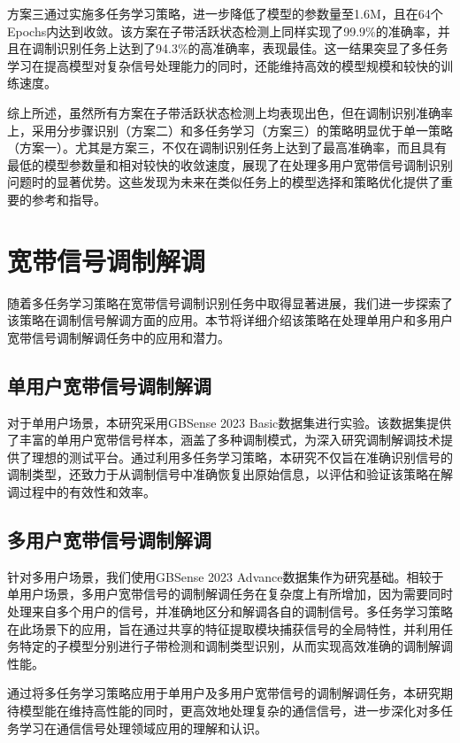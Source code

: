 方案三通过实施多任务学习策略，进一步降低了模型的参数量至1.6M，且在64个Epochs内达到收敛。该方案在子带活跃状态检测上同样实现了99.9\%的准确率，并且在调制识别任务上达到了94.3\%的高准确率，表现最佳。这一结果突显了多任务学习在提高模型对复杂信号处理能力的同时，还能维持高效的模型规模和较快的训练速度。

综上所述，虽然所有方案在子带活跃状态检测上均表现出色，但在调制识别准确率上，采用分步骤识别（方案二）和多任务学习（方案三）的策略明显优于单一策略（方案一）。尤其是方案三，不仅在调制识别任务上达到了最高准确率，而且具有最低的模型参数量和相对较快的收敛速度，展现了在处理多用户宽带信号调制识别问题时的显著优势。这些发现为未来在类似任务上的模型选择和策略优化提供了重要的参考和指导。

\section{宽带信号调制解调}\label{sec:mod_demod}

随着多任务学习策略在宽带信号调制识别任务中取得显著进展，我们进一步探索了该策略在调制信号解调方面的应用。本节将详细介绍该策略在处理单用户和多用户宽带信号调制解调任务中的应用和潜力。

\subsection{单用户宽带信号调制解调}

对于单用户场景，本研究采用GBSense 2023 Basic数据集进行实验。该数据集提供了丰富的单用户宽带信号样本，涵盖了多种调制模式，为深入研究调制解调技术提供了理想的测试平台。通过利用多任务学习策略，本研究不仅旨在准确识别信号的调制类型，还致力于从调制信号中准确恢复出原始信息，以评估和验证该策略在解调过程中的有效性和效率。

\subsection{多用户宽带信号调制解调}

针对多用户场景，我们使用GBSense 2023 Advance数据集作为研究基础。相较于单用户场景，多用户宽带信号的调制解调任务在复杂度上有所增加，因为需要同时处理来自多个用户的信号，并准确地区分和解调各自的调制信号。多任务学习策略在此场景下的应用，旨在通过共享的特征提取模块捕获信号的全局特性，并利用任务特定的子模型分别进行子带检测和调制类型识别，从而实现高效准确的调制解调性能。

通过将多任务学习策略应用于单用户及多用户宽带信号的调制解调任务，本研究期待模型能在维持高性能的同时，更高效地处理复杂的通信信号，进一步深化对多任务学习在通信信号处理领域应用的理解和认识。

